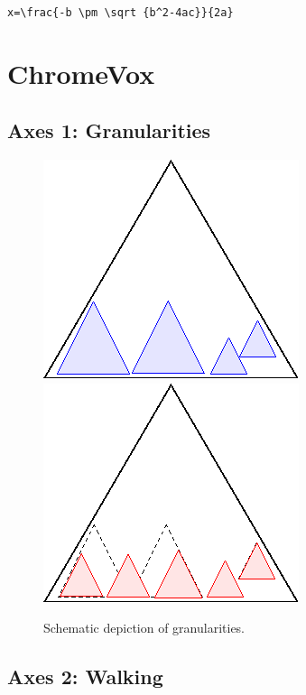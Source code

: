 \documentclass{sig-alternate}
\begin{document}
\verb+x=\frac{-b \pm \sqrt {b^2-4ac}}{2a}+

\section{ChromeVox}
\label{sec:chromevox}


\subsection{Axes 1: Granularities}
\label{sec:ax1}


\begin{figure}[h!]
  \begin{center}
    \leavevmode
    \includegraphics[width=.4\columnwidth]{images/granularity1}
    \includegraphics[width=.4\columnwidth]{images/granularity2}
    \caption{Schematic depiction of granularities.}
    \label{fig:granularity}
  \end{center}
\end{figure}

\subsection{Axes 2: Walking}
\label{sec:ax2}
\end{document}
